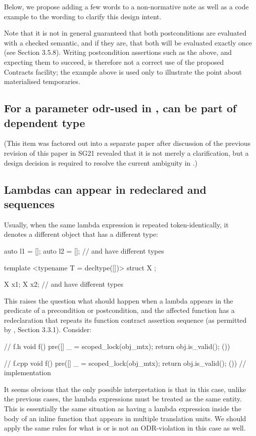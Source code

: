 Below, we propose adding a few words to a non-normative note as well as a code example to the wording to clarify this design intent.

Note that it is not in general guaranteed that both postconditions are evaluated with a checked semantic, and if they are, that both will be evaluated exactly once (see \cite{P2900R10} Section 3.5.8). Writing postcondition assertions such as the above, and expecting them to succeed, is therefore not a correct use of the proposed Contracts facility; the example above is used only to illustrate the point about materialised temporaries.

\subsection{For a parameter odr-used in ,  can be part of dependent type}

(This item was factored out into a separate paper \cite{P3489R0} after discussion of the previous revision of this paper in SG21 revealed that it is not merely a clarification, but a design decision is required to resolve the current ambiguity in \cite{P2900R10}.)

\subsection{Lambdas can appear in redeclared  and  sequences}

Usually, when the same lambda expression is repeated token-identically, it denotes a different object that has a different type:
\begin{codeblock}
auto l1 = []{};  
auto l2 = []{};
//  and  have different types

template <typename T = decltype([]{})>
struct X {};

X x1;
X x2;
//  and  have different types
\end{codeblock}
This raises the question what should happen when a lambda appears in the predicate of a precondition or postcondition, and the affected function has a redeclaration that repeats its function contract assertion sequence (as permitted by \cite{P2900R10}, Section 3.3.1). Consider:
\begin{codeblock}
// f.h
void f() pre([]{ _ = scoped_lock(obj_mtx); return obj.is_valid(); }())

// f.cpp  
void f() pre([]{ _ = scoped_lock(obj_mtx); return obj.is_valid(); }()) {
  // implementation
}
\end{codeblock}
It seems obvious that the only possible interpretation is that in this case, unlike the previous cases, the lambda expressions must be treated as the same entity. This is essentially the same situation as having a lambda expression inside the body of an inline function that appears in multiple translation units. We should apply the same rules for what is or is not an ODR-violation in this case as well.


